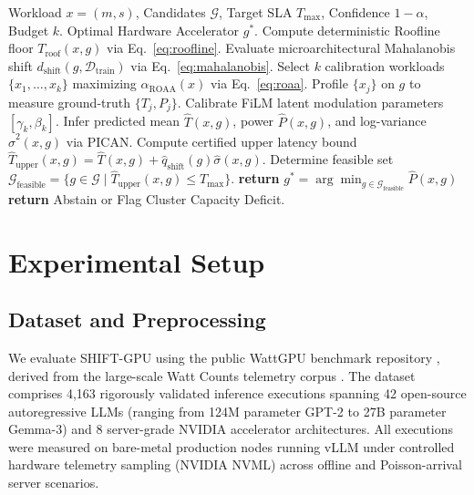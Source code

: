 \documentclass[3p,12pt]{elsarticle}
\begin{document}
\begin{algorithm}[t]
\caption{SHIFT-GPU Admission Control, Conformal Risk Calibration, and Active Adaptation}
\label{alg:shift_gpu}
\begin{algorithmic}[1]
\REQUIRE Workload $x = (m, s)$, Candidates $\mathcal{G}$, Target SLA $T_{\max}$, Confidence $1-\alpha$, Budget $k$.
\ENSURE Optimal Hardware Accelerator $g^*$.
    \STATE Compute deterministic Roofline floor $T_{\text{roof}}(x, g)$ via Eq.~\eqref{eq:roofline}.
    \STATE Evaluate microarchitectural Mahalanobis shift $d_{\text{shift}}(g, \mathcal{D}_{\text{train}})$ via Eq.~\eqref{eq:mahalanobis}.
        \STATE Select $k$ calibration workloads $\{x_1, \dots, x_k\}$ maximizing $\alpha_{\text{ROAA}}(x)$ via Eq.~\eqref{eq:roaa}.
        \STATE Profile $\{x_j\}$ on $g$ to measure ground-truth $\{T_j, P_j\}$.
        \STATE Calibrate FiLM latent modulation parameters $[\gamma_k, \beta_k]$.
    \ENDIF
    \STATE Infer predicted mean $\hat{T}(x, g)$, power $\hat{P}(x, g)$, and log-variance $\hat{\sigma}^2(x, g)$ via PICAN.
    \STATE Compute certified upper latency bound $\hat{T}_{\text{upper}}(x, g) = \hat{T}(x, g) + \hat{q}_{\text{shift}}(g) \hat{\sigma}(x, g)$.
\ENDFOR
\STATE Determine feasible set $\mathcal{G}_{\text{feasible}} = \{g \in \mathcal{G} \mid \hat{T}_{\text{upper}}(x, g) \le T_{\max}\}$.
    \STATE \textbf{return} $g^* = \arg\min_{g \in \mathcal{G}_{\text{feasible}}} \hat{P}(x, g)$
\ELSE
    \STATE \textbf{return} Abstain or Flag Cluster Capacity Deficit.
\ENDIF
\end{algorithmic}
\end{algorithm}

\section{Experimental Setup}
\label{sec:experiments}

\subsection{Dataset and Preprocessing}
We evaluate SHIFT-GPU using the public WattGPU benchmark repository \citep{fadel2026wattgpu}, derived from the large-scale Watt Counts telemetry corpus \citep{fadel2026wattgpu}. The dataset comprises 4,163 rigorously validated inference executions spanning 42 open-source autoregressive LLMs (ranging from 124M parameter GPT-2 to 27B parameter Gemma-3) and 8 server-grade NVIDIA accelerator architectures. All executions were measured on bare-metal production nodes running vLLM under controlled hardware telemetry sampling (NVIDIA NVML) across offline and Poisson-arrival server scenarios.
\end{document}
